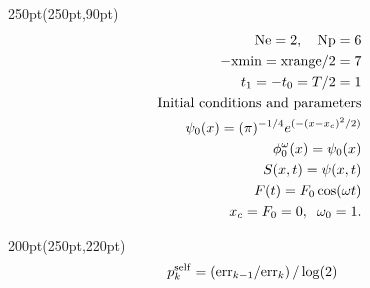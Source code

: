 \begin{frame}
\begin{textblock*}{250pt}(250pt,90pt)
	\begin{align}
         {\rm Ne} = 2,\hspace{10pt} {\rm Np}  = 6 &\nonumber\\
		-{\rm xmin} = {\rm xrange}/2  = 7 &\nonumber\\
		             t_1 = -t_0 = T/2 = 1 &\nonumber\\
	  \mbox{Initial conditions and parameters}&\nonumber\\
       \psi_0(x) = (\pi)^{-1/4}e^{(-(x-x_c)^2/2)} &\nonumber\\
	             \phi^\omega_0(x) = \psi_0(x) &\nonumber\\
		                S(x,t) = \psi(x,t)&\nonumber\\
		          F(t) = F_0\cos(\omega t)&\nonumber\\
		     x_c = F_0 = 0,\;\;\omega_0 = 1. \nonumber
         \end{align}
\end{textblock*}
\begin{textblock*}{200pt}(250pt,220pt)
	\begin{align}
	p_k^{\rm self} & = \left({\rm err}_{k-1}/{\rm err}_{k}\right)/\log(2) \nonumber
	\end{align}

\end{textblock*}


\end{frame}


